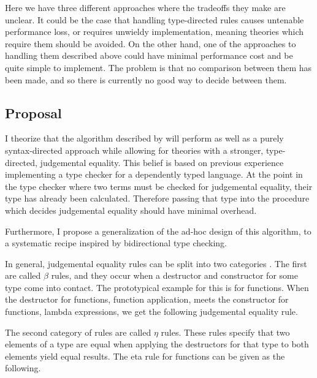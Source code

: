 \documentclass{article}
\begin{document}
Here we have three different approaches where the tradeoffs they make are unclear.
It could be the case that handling type-directed rules causes untenable performance loss, or requires unwieldy implementation, meaning theories which require them should be avoided.
On the other hand, one of the approaches to handling them described above could have minimal performance cost and be quite simple to implement.
The problem is that no comparison between them has been made, and so there is currently no good way to decide between them.

\subsection{Proposal}


I theorize that the algorithm described by \citet{Chapman2005} will perform as well as a purely syntax-directed approach while allowing for theories with a stronger, type-directed, judgemental equality.
This belief is based on previous experience implementing a type checker for a dependently typed language.
At the point in the type checker where two terms must be checked for judgemental equality, their type has already been calculated.
Therefore passing that type into the procedure which decides judgemental equality should have minimal overhead.

Furthermore, I propose a generalization of the ad-hoc design of this algorithm, to a systematic recipe inspired by bidirectional type checking.

In general, judgemental equality rules can be split into two categories \citep{MartinLof1975}.
The first are called $\beta$ rules, and they occur when a destructor and constructor for some type come into contact.
The prototypical example for this is for functions.
When the destructor for functions, function application, meets the constructor for functions, lambda expressions, we get the following judgemental equality rule.

\begin{mathpar}
\end{mathpar}

The second category of rules are called $\eta$ rules.
These rules specify that two elements of a type are equal when applying the destructors for that type to both elements yield equal results.
The eta rule for functions can be given as the following.
\end{document}
